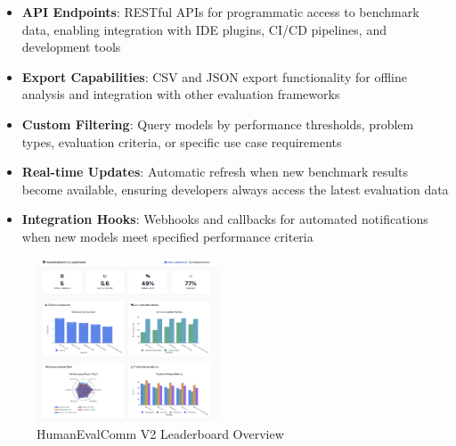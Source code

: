\documentclass[conference]{IEEEtran}
\begin{document}
\begin{itemize}
    \item \textbf{API Endpoints}: RESTful APIs for programmatic access to benchmark data, enabling integration with IDE plugins, CI/CD pipelines, and development tools
    \item \textbf{Export Capabilities}: CSV and JSON export functionality for offline analysis and integration with other evaluation frameworks
    \item \textbf{Custom Filtering}: Query models by performance thresholds, problem types, evaluation criteria, or specific use case requirements
    \item \textbf{Real-time Updates}: Automatic refresh when new benchmark results become available, ensuring developers always access the latest evaluation data
    \item \textbf{Integration Hooks}: Webhooks and callbacks for automated notifications when new models meet specified performance criteria
\end{itemize}

\begin{figure}[ht]
    \centering
    \includegraphics[width=0.48\textwidth]{../leaderboard.png}
    \caption{HumanEvalComm V2 Leaderboard Overview}
    \label{fig:leaderboard-overview}
\end{figure}



\end{document}
